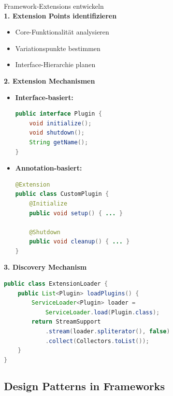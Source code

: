 \begin{KR}{Framework-Extensions entwickeln}\\
\textbf{1. Extension Points identifizieren}
\begin{itemize}
    \item Core-Funktionalität analysieren
    \item Variationspunkte bestimmen
    \item Interface-Hierarchie planen
\end{itemize}

\textbf{2. Extension Mechanismen}
\begin{itemize}
    \item \textbf{Interface-basiert:}
    \begin{lstlisting}[language=Java, style=basesmol]
public interface Plugin {
    void initialize();
    void shutdown();
    String getName();
}
    \end{lstlisting}
    
    \item \textbf{Annotation-basiert:}
    \begin{lstlisting}[language=Java, style=basesmol]
@Extension
public class CustomPlugin {
    @Initialize
    public void setup() { ... }
    
    @Shutdown
    public void cleanup() { ... }
}
    \end{lstlisting}
\end{itemize}

\textbf{3. Discovery Mechanism}
\begin{lstlisting}[language=Java, style=basesmol]
public class ExtensionLoader {
    public List<Plugin> loadPlugins() {
        ServiceLoader<Plugin> loader = 
            ServiceLoader.load(Plugin.class);
        return StreamSupport
            .stream(loader.spliterator(), false)
            .collect(Collectors.toList());
    }
}
\end{lstlisting}
\end{KR}



\subsection{Design Patterns in Frameworks}


